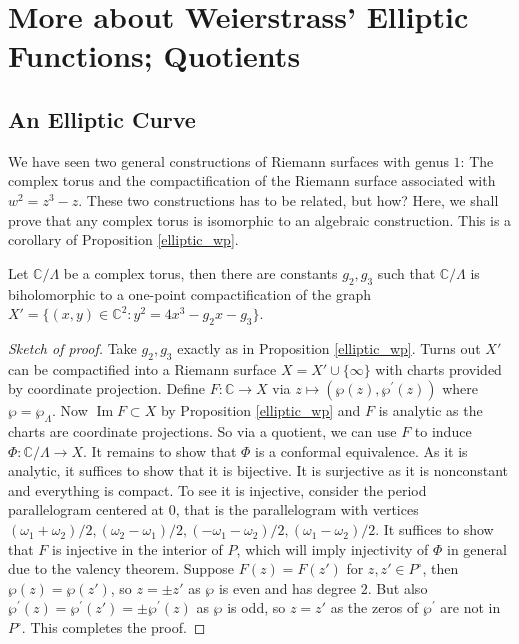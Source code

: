 \section{More about Weierstrass' Elliptic Functions; Quotients}
\subsection{An Elliptic Curve}
We have seen two general constructions of Riemann surfaces with genus $1$:
The complex torus and the compactification of the Riemann surface associated with $w^2=z^3-z$.
These two constructions has to be related, but how?
Here, we shall prove that any complex torus is isomorphic to an algebraic construction.
This is a corollary of Proposition \ref{elliptic_wp}.
\begin{corollary}
    Let $\mathbb C/\Lambda$ be a complex torus, then there are constants $g_2,g_3$ such that $\mathbb C/\Lambda$ is biholomorphic to a one-point compactification of the graph $X'=\{(x,y)\in\mathbb C^2:y^2=4x^3-g_2x-g_3\}$.
\end{corollary}
\begin{proof}[Sketch of proof]
    Take $g_2,g_3$ exactly as in Proposition \ref{elliptic_wp}.
    Turns out $X'$ can be compactified into a Riemann surface $X=X'\cup\{\infty\}$ with charts provided by coordinate projection.
    Define $F:\mathbb C\to X$ via $z\mapsto(\wp(z),\wp^\prime(z))$ where $\wp=\wp_\Lambda$.
    Now $\operatorname{Im}F\subset X$ by Proposition \ref{elliptic_wp} and $F$ is analytic as the charts are coordinate projections.
    So via a quotient, we can use $F$ to induce $\Phi:\mathbb C/\Lambda\to X$.
    It remains to show that $\Phi$ is a conformal equivalence.
    As it is analytic, it suffices to show that it is bijective.
    It is surjective as it is nonconstant and everything is compact.
    To see it is injective, consider the period parallelogram centered at $0$, that is the parallelogram with vertices $(\omega_1+\omega_2)/2,(\omega_2-\omega_1)/2,(-\omega_1-\omega_2)/2,(\omega_1-\omega_2)/2$.
    It suffices to show that $F$ is injective in the interior of $P$, which will imply injectivity of $\Phi$ in general due to the valency theorem.
    Suppose $F(z)=F(z')$ for $z,z'\in P^\circ$, then $\wp(z)=\wp(z')$, so $z=\pm z'$ as $\wp$ is even and has degree $2$.
    But also $\wp^\prime(z)=\wp^\prime(z')=\pm \wp^\prime(z)$ as $\wp$ is odd, so $z=z'$ as the zeros of $\wp^\prime$ are not in $P^\circ$.
    This completes the proof.
\end{proof}
